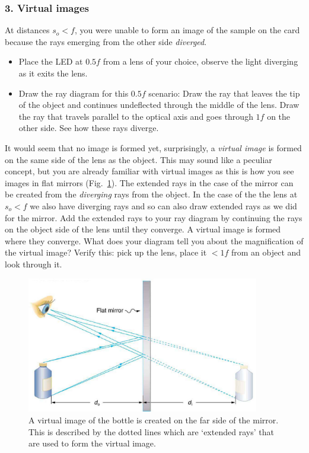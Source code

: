 \documentclass[a4paper]{report}
\begin{document}
\clearpage


\subsubsection{3. Virtual images}
At distances $s_o<f$, you were unable to form an image of the sample on the card because the rays emerging from the other side \textit{diverged}.
\begin{itemize}
\item Place the LED at $0.5f$ from a lens of your choice, observe the light diverging as it exits the lens.
\item Draw the ray diagram for this $0.5f$ scenario:
Draw the ray that leaves the tip of the object and continues undeflected through the middle of the lens. 
Draw the ray that travels parallel to the optical axis and goes through $1f$ on the other side.
See how these rays diverge. 
\end{itemize}

It would seem that no image is formed yet, surprisingly, a \textit{virtual image} is formed on the same side of the lens as the object. 
This may sound like a peculiar concept, but you are already familiar with virtual images as this is how you see images in flat mirrors (Fig.~\ref{fig:mirror}). 
The extended rays in the case of the mirror can be created from the \textit{diverging} rays from the object. 
In the case of the the lens at $s_o<f$ we also have diverging rays and so can also draw extended rays as we did for the mirror. 
Add the extended rays to your ray diagram by continuing the rays on the object side of the lens until they converge. 
A virtual image is formed where they converge.
What does your diagram tell you about the magnification of the virtual image?
Verify this: pick up the lens, place it $<1f$ from an object and look through it.
\begin{figure}[h]
\center
\includegraphics[width=4in]{virtual_image_mirr.eps}
\caption{A virtual image of the bottle is created on the far side of the mirror. 
This is described by the dotted lines which are `extended rays' that are used to form the virtual image. }
\label{fig:mirror}
\end{figure}
\end{document}
